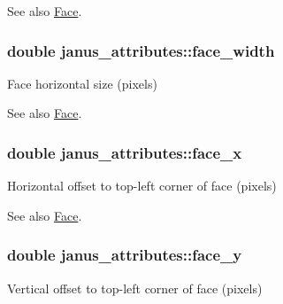 \begin{DoxySeeAlso}{See also}
\hyperlink{group__janus_face}{Face}. 
\end{DoxySeeAlso}
\hypertarget{structjanus__attributes_ad79876a2b52d6a1a5d1290a7d401e46a}{}
\subsubsection[{face\+\_\+width}]{\setlength{\rightskip}{0pt plus 5cm}double janus\+\_\+attributes\+::face\+\_\+width}\label{structjanus__attributes_ad79876a2b52d6a1a5d1290a7d401e46a}


Face horizontal size (pixels) 

\begin{DoxySeeAlso}{See also}
\hyperlink{group__janus_face}{Face}. 
\end{DoxySeeAlso}
\hypertarget{structjanus__attributes_ae601c39225ae377dfa1728ef5b8b245b}{}
\subsubsection[{face\+\_\+x}]{\setlength{\rightskip}{0pt plus 5cm}double janus\+\_\+attributes\+::face\+\_\+x}\label{structjanus__attributes_ae601c39225ae377dfa1728ef5b8b245b}


Horizontal offset to top-\/left corner of face (pixels) 

\begin{DoxySeeAlso}{See also}
\hyperlink{group__janus_face}{Face}. 
\end{DoxySeeAlso}
\hypertarget{structjanus__attributes_afc92218bb77128e6e2c10337d3413545}{}
\subsubsection[{face\+\_\+y}]{\setlength{\rightskip}{0pt plus 5cm}double janus\+\_\+attributes\+::face\+\_\+y}\label{structjanus__attributes_afc92218bb77128e6e2c10337d3413545}


Vertical offset to top-\/left corner of face (pixels) 

